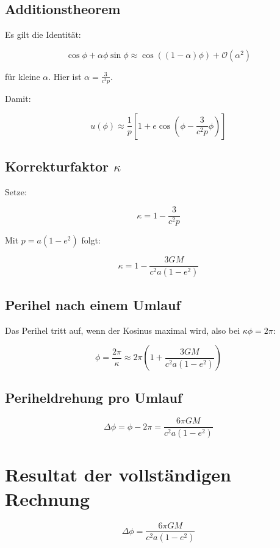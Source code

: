 \subsection{Additionstheorem}
\label{sub:periheldrehung_addition}

Es gilt die Identität:

\[
\cos \phi + \alpha \phi \sin \phi \approx \cos( (1 - \alpha) \phi ) + \mathcal{O}(\alpha^2)
\]

für kleine \( \alpha \). Hier ist \( \alpha = \frac{3}{c^2 p} \).

Damit:

\[
u(\phi) \approx \frac{1}{p} \left[ 1 + e \cos\left( \phi - \frac{3}{c^2 p} \phi \right) \right]
\]

\subsection{Korrekturfaktor \( \kappa \)}
\label{sub:periheldrehung_kappa}

Setze:

\[
\kappa = 1 - \frac{3}{c^2 p}
\]

Mit \( p = a(1-e^2) \) folgt:

\[
\kappa = 1 - \frac{3GM}{c^2 a(1-e^2)}
\]

\subsection{Perihel nach einem Umlauf}
\label{sub:periheldrehung_perihel_umlauf}

Das Perihel tritt auf, wenn der Kosinus maximal wird, also bei 
\( \kappa \phi = 2\pi \):

\[
\phi = \frac{2\pi}{\kappa} \approx 2\pi \left(1 + \frac{3GM}{c^2 a(1-e^2)}\right)
\]

\subsection{Periheldrehung pro Umlauf}
\label{sub:periheldrehung_formel}

\[
\Delta\phi = \phi - 2\pi = \frac{6\pi GM}{c^2 a(1-e^2)}
\]

\section{Resultat der vollständigen Rechnung}
\label{app:periheldrehung_resultat}

\[
\boxed{\Delta\phi = \frac{6\pi GM}{c^2 a(1-e^2)}}
\]

